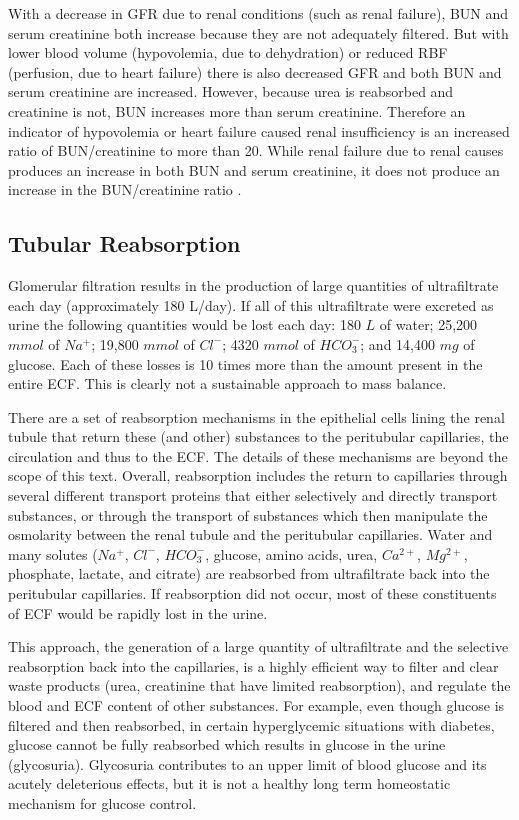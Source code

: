 With a decrease in GFR due to renal conditions (such as renal failure), BUN and serum creatinine both increase because they are not adequately filtered. But with lower blood volume (hypovolemia, due to dehydration) or reduced RBF (perfusion, due to heart failure) there is also decreased GFR and both BUN and serum creatinine are increased. However, because urea is reabsorbed and creatinine is not, BUN increases more than serum creatinine. Therefore an indicator of hypovolemia or heart failure caused renal insufficiency is an increased ratio of BUN/creatinine to more than 20. While renal failure due to renal causes produces an increase in both BUN and serum creatinine, it does not produce an increase in the BUN/creatinine ratio \cite{hall_guyton_2020}.



\subsection{Tubular Reabsorption}

Glomerular filtration results in the production of large quantities of ultrafiltrate each day (approximately  180 L/day). If all of this ultrafiltrate were excreted as urine the following quantities would be lost each day: 180 $L$ of water; 25,200 $mmol$ of $Na^+$; 19,800 $mmol$ of $Cl^-$; 4320 $mmol$ of $HCO_{3}^{-}$; and 14,400 $mg$ of glucose. Each of these losses is 10 times more than the amount present in the entire ECF. This is clearly not a sustainable approach to mass balance. 

There are a set of reabsorption mechanisms in the epithelial cells lining the renal tubule that return these (and other) substances to the peritubular capillaries, the circulation and thus to the ECF. The details of these mechanisms are beyond the scope of this text. Overall, reabsorption includes the return to capillaries through several different transport proteins that either selectively and directly transport substances, or through the transport of substances which then manipulate the osmolarity between the renal tubule and the peritubular capillaries.  Water and many solutes ($Na^+$, $Cl^-$, $HCO_3^-$, glucose, amino acids, urea, $Ca^{2+}$, $Mg^{2+}$, phosphate, lactate, and citrate) are reabsorbed from ultrafiltrate back into the peritubular capillaries. If reabsorption did not occur, most of these constituents of ECF would be rapidly lost in the urine.

This approach, the generation of a large quantity of ultrafiltrate and the selective reabsorption back into the capillaries, is a highly efficient way to filter and clear waste products (urea, creatinine that have limited reabsorption), and regulate the blood and ECF content of other substances. For example, even though glucose is filtered and then reabsorbed, in certain hyperglycemic situations with diabetes, glucose cannot be fully reabsorbed which results in glucose in the urine (glycosuria).  Glycosuria contributes to an upper limit of blood glucose and its acutely deleterious effects, but it is not a healthy long term homeostatic mechanism for glucose control. 

